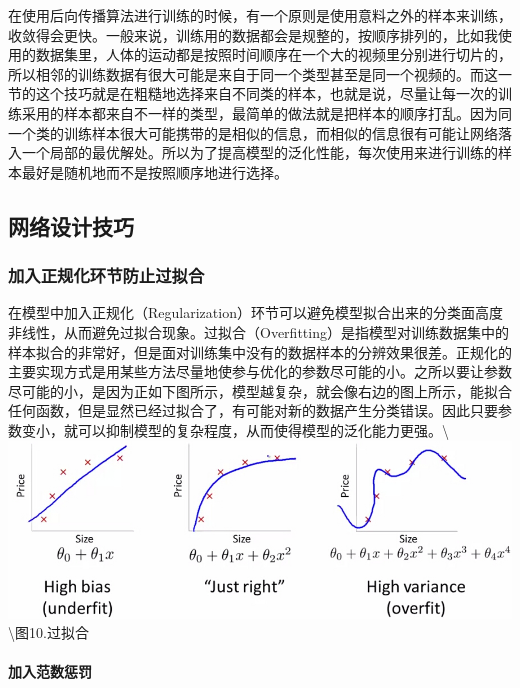 在使用后向传播算法进行训练的时候，有一个原则是使用意料之外的样本来训练，收敛得会更快。一般来说，训练用的数据都会是规整的，按顺序排列的，比如我使用的数据集里，人体的运动都是按照时间顺序在一个大的视频里分别进行切片的，所以相邻的训练数据有很大可能是来自于同一个类型甚至是同一个视频的。而这一节的这个技巧就是在粗糙地选择来自不同类的样本，也就是说，尽量让每一次的训练采用的样本都来自不一样的类型，最简单的做法就是把样本的顺序打乱。因为同一个类的训练样本很大可能携带的是相似的信息，而相似的信息很有可能让网络落入一个局部的最优解处。所以为了提高模型的泛化性能，每次使用来进行训练的样本最好是随机地而不是按照顺序地进行选择。

\subsection{网络设计技巧}\label{ux7f51ux7edcux8bbeux8ba1ux6280ux5de7}

\subsubsection{加入正规化环节防止过拟合}\label{ux52a0ux5165ux6b63ux89c4ux5316ux73afux8282ux9632ux6b62ux8fc7ux62dfux5408}

在模型中加入正规化（Regularization）环节可以避免模型拟合出来的分类面高度非线性，从而避免过拟合现象。过拟合（Overfitting）是指模型对训练数据集中的样本拟合的非常好，但是面对训练集中没有的数据样本的分辨效果很差。正规化的主要实现方式是用某些方法尽量地使参与优化的参数尽可能的小。之所以要让参数尽可能的小，是因为正如下图所示，模型越复杂，就会像右边的图上所示，能拟合任何函数，但是显然已经过拟合了，有可能对新的数据产生分类错误。因此只要参数变小，就可以抑制模型的复杂程度，从而使得模型的泛化能力更强。\textbackslash{}\includegraphics{picture/overfit.jpg}\textbackslash{}图10.过拟合

\paragraph{加入范数惩罚}\label{ux52a0ux5165ux8303ux6570ux60e9ux7f5a}

